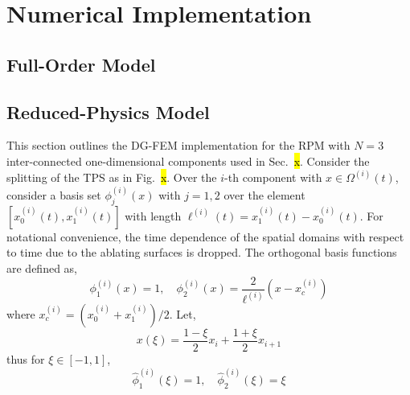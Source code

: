 \appendix

\section{Numerical Implementation}\label{app_implementation}

\subsection{Full-Order Model}

\subsection{Reduced-Physics Model}

This section outlines the DG-FEM implementation for the RPM with $N=3$ inter-connected one-dimensional components used in Sec.~\hl{x}. Consider the splitting of the TPS as in Fig.~\hl{x}. Over the $i$-th component with $x\in\Omega^{(i)}(t)$, consider a basis set $\phi^{(i)}_j(x)$ with $j=1,2$ over the element $[x^{(i)}_{0}(t),x^{(i)}_{1}(t)]$ with length $\ell^{(i)}(t)=x^{(i)}_{1}(t) - x^{(i)}_{0}(t)$. For notational convenience, the time dependence of the spatial domains with respect to time due to the ablating surfaces is dropped. The orthogonal basis functions are defined as,
\begin{equation}
    \phi^{(i)}_1(x) = 1,\quad \phi^{(i)}_2(x) = \frac{2}{\ell^{(i)}}\left(x - x^{(i)}_c\right)
\end{equation}
where $x^{(i)}_c = (x^{(i)}_0 + x^{(i)}_1) / 2$. Let,
\[
    x(\xi) = \frac{1-\xi}{2}x_i + \frac{1 + \xi}{2}x_{i+1}
\]
thus for $\xi\in[-1,1]$,
\begin{equation}
    \hat{\phi}^{(i)}_1(\xi) = 1, \quad \hat{\phi}^{(i)}_2(\xi) = \xi
\end{equation}

